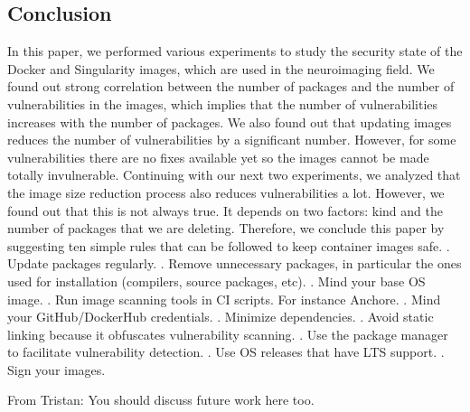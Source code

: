 \documentclass[a4paper,num-refs]{oup-contemporary}
\newcommand{\tristan}[1]{\color{blue}From Tristan: #1\color{black}}
\begin{document}
\subsection{Conclusion}


In this paper, we performed various experiments to study the security state of the Docker
and Singularity images, which are used in the neuroimaging field. We found out strong correlation
between the number of packages and the number of vulnerabilities in the images, which implies
that the number of vulnerabilities increases with the number of packages. We also found out that
updating images reduces the number of vulnerabilities by a significant number. However, for some
vulnerabilities there are no fixes available yet so the images cannot 
be made totally invulnerable. Continuing with our next two experiments, we analyzed that the
image size reduction process also reduces vulnerabilities a lot. However, we found out that this is not
always true. It depends on two factors: kind and the number of packages that we are
deleting. Therefore, we conclude this paper by suggesting ten simple rules that can be
followed to keep container images safe.
. Update packages regularly.
. Remove unnecessary packages, in particular the ones used for installation (compilers, source packages, etc).
. Mind your base OS image.
. Run image scanning tools in CI scripts. For instance Anchore.
. Mind your GitHub/DockerHub credentials.
. Minimize dependencies.
. Avoid static linking because it obfuscates vulnerability scanning.
. Use the package manager to facilitate vulnerability detection.
. Use OS releases that have LTS support.
. Sign your images.

\tristan{You should discuss future work here too.}


\end{document}
